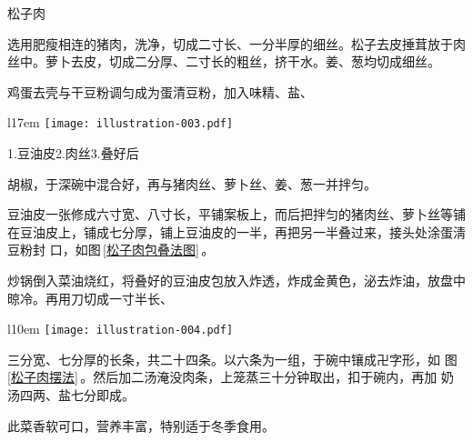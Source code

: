 \begin{recipe}{松子肉}

\ingredients


\preparation

\step 选用肥瘦相连的猪肉，洗净，切成二寸长、一分半厚的细丝。松子去皮捶茸放于肉
丝中。萝卜去皮，切成二分厚、二寸长的粗丝，挤干水。姜、葱均切成细丝。

\step 鸡蛋去壳与干豆粉调匀成为蛋清豆粉，加入味精、盐、
\begin{wrapfigure}[7]{l}{17em}%
\centering%
\vspace{-.4375\baselineskip}%
\texttt{[image: illustration-003.pdf]}%
\vspace{-.5625\baselineskip}%
\caption{松子肉包叠法图}%
\label{松子肉包叠法图}%
{\small 1.豆油皮\hspace{1em}2.肉丝\hspace{1em}3.叠好后}%
\end{wrapfigure}%
胡椒，于深碗中混合好，再与猪肉丝、萝卜丝、姜、葱一并拌匀。

\step 豆油皮一张修成六寸宽、八寸长，平铺案板上，而后把拌匀的猪肉丝、萝卜丝等铺
在豆油皮上，铺成七分厚，铺上豆油皮的一半，再把另一半叠过来，接头处涂蛋淸豆粉封
口，如图\,\ref{松子肉包叠法图}\,。

\step 炒锅倒入菜油烧红，将叠好的豆油皮包放入炸透，炸成金黄色，泌去炸油，放盘中
晾冷。再用刀切成一寸半长、
\begin{wrapfigure}[5]{l}{10em}%
\centering%
\vspace{-1.25\baselineskip}%
\texttt{[image: illustration-004.pdf]}%
\vspace{-.5625\baselineskip}%
\caption{松子肉摆法}%
\label{松子肉摆法}%
\end{wrapfigure}%
三分宽、七分厚的长条，共二十四条。以六条为一组，于碗中镶成卍字形，如
图\,\ref{松子肉摆法}\,。然后加二汤淹没肉条，上笼蒸三十分钟取出，扣于碗内，再加
奶汤四两、盐七分即成。

\features

此菜香软可口，营养丰富，特别适于冬季食用。

\end{recipe}

